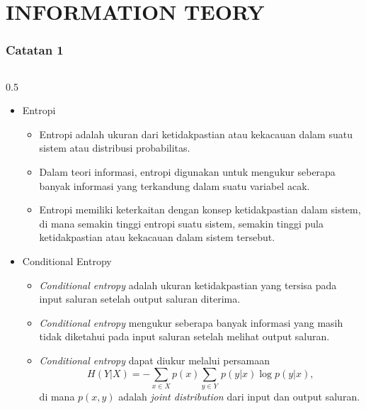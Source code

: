 \section{INFORMATION TEORY} %

\begin{frame}
    \frametitle{Catatan 1}
       \vspace*{-0.5cm}
  \begin{columns}[T]
  \small
    \begin{column}{0.5\textwidth}
        \begin{itemize}
            \item Entropi \cite{djordjevic2019physical}\\
                \begin{itemize}
                \tiny \justifying                
                    \item[$\Rightarrow$] Entropi adalah ukuran dari ketidakpastian atau kekacauan dalam suatu sistem atau distribusi probabilitas.
                    \item[$\Rightarrow$]  Dalam teori informasi, entropi digunakan untuk mengukur seberapa banyak informasi yang terkandung dalam suatu variabel acak. 
                    \item[$\Rightarrow$] Entropi memiliki keterkaitan dengan konsep ketidakpastian dalam sistem, di mana semakin tinggi entropi suatu sistem, semakin tinggi pula ketidakpastian atau kekacauan dalam sistem tersebut.
                \end{itemize}
            \item Conditional Entropy\\
                \begin{itemize}
                \tiny \justifying
                    \item[$\Rightarrow$] \textit{Conditional entropy} adalah ukuran ketidakpastian yang tersisa pada input saluran setelah output saluran diterima.
                    \item[$\Rightarrow$]  \textit{Conditional entropy} mengukur seberapa banyak informasi yang masih tidak diketahui pada input saluran setelah melihat output saluran.
                    \item[$\Rightarrow$] \textit{Conditional entropy} dapat diukur melalui persamaan
                        \begin{equation}
                            H(Y|X) = -\sum_{x \in X} p(x) \sum_{y \in Y}  \, p(y|x) \log p(y|x),
                        \end{equation}
                     di mana $p(x,y)$ adalah \textit{joint distribution} dari input dan output saluran.
                \end{itemize}
        \end{itemize}
    \end{column}


\end{columns}
\end{frame}
